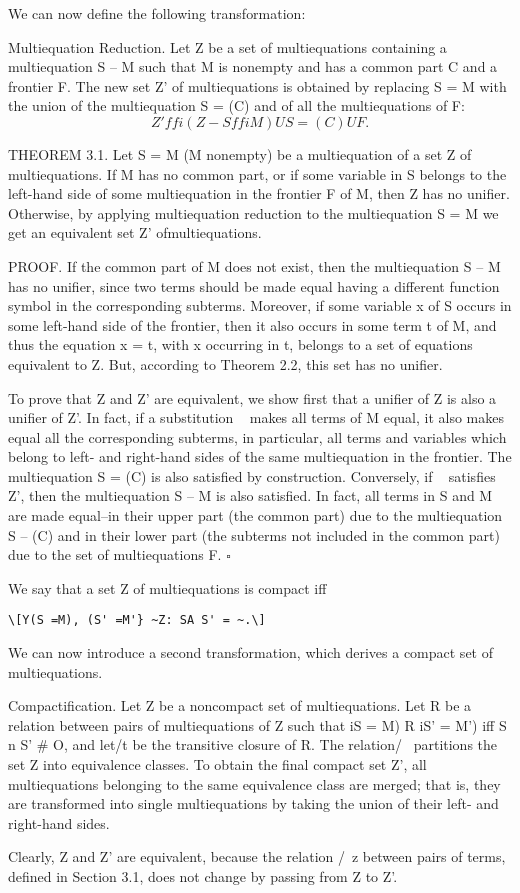 We can now define the following transformation: 

Multiequation Reduction. Let Z be a set of multiequations containing a
multiequation S -- M such that M is nonempty and has a common part C and a
frontier F. The new set Z' of multiequations is obtained by replacing S = M with
the union of the multiequation S = (C) and of all the multiequations of F:
\[Z'ffi(Z- {SffiM})U{S=(C)} UF.\]

THEOREM 3.1. Let S = M (M nonempty) be a multiequation of a set Z of
multiequations. If M has no common part, or if some variable in S belongs to
the left-hand side of some multiequation in the frontier F of M, then Z has no 
unifier. Otherwise, by applying multiequation reduction to the multiequation
S = M we get an equivalent set Z' ofmultiequations. 

PROOF. If the common part of M does not exist, then the multiequation S -- M
has no unifier, since two terms should be made equal having a different function
symbol in the corresponding subterms. Moreover, if some variable x of S occurs
in some left-hand side of the frontier, then it also occurs in some term t of M, and
thus the equation x = t, with x occurring in t, belongs to a set of equations
equivalent to Z. But, according to Theorem 2.2, this set has no unifier. 

To prove that Z and Z' are equivalent, we show first that a unifier of Z is also
a unifier of Z'. In fact, if a substitution ~ makes all terms of M equal, it also
makes equal all the corresponding subterms, in particular, all terms and variables
which belong to left- and right-hand sides of the same multiequation in the
frontier. The multiequation S = (C) is also satisfied by construction. Conversely,
if ~ satisfies Z', then the multiequation S -- M is also satisfied. In fact, all terms
in S and M are made equal--in their upper part (the common part) due to the
multiequation S -- (C) and in their lower part (the subterms not included in the
common part) due to the set of multiequations F. $\square$

We say that a set Z of multiequations is compact iff
\begin{verbatim}
\[Y(S =M), (S' =M'} ~Z: SA S' = ~.\]
\end{verbatim}
We can now introduce a second transformation, which derives a compact set of
multiequations. 

Compactification. Let Z be a noncompact set of multiequations. Let R be a
relation between pairs of multiequations of Z such that iS = M) R iS' = M') iff
S n S' \# O, and let/t be the transitive closure of R. The relation/~ partitions
the set Z into equivalence classes. To obtain the final compact set Z', all multiequations
belonging to the same equivalence class are merged; that is, they are
transformed into single multiequations by taking the union of their left- and
right-hand sides. 

Clearly, Z and Z' are equivalent, because the relation /~z between pairs of
terms, defined in Section 3.1, does not change by passing from Z to Z'. 
  